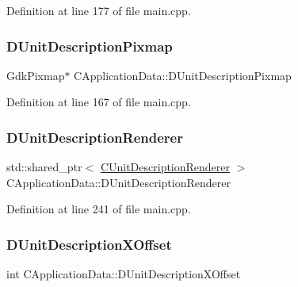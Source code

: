Definition at line 177 of file main.\+cpp.

\hypertarget{classCApplicationData_a52e5c1a2ac452c82580ba3f4978c3501}{}\label{classCApplicationData_a52e5c1a2ac452c82580ba3f4978c3501} 
\subsubsection{\texorpdfstring{D\+Unit\+Description\+Pixmap}{DUnitDescriptionPixmap}}
{\footnotesize\ttfamily Gdk\+Pixmap$\ast$ C\+Application\+Data\+::\+D\+Unit\+Description\+Pixmap\hspace{0.3cm}{\ttfamily [protected]}}



Definition at line 167 of file main.\+cpp.

\hypertarget{classCApplicationData_a194301f34566fc497b032bdfcad55287}{}\label{classCApplicationData_a194301f34566fc497b032bdfcad55287} 
\subsubsection{\texorpdfstring{D\+Unit\+Description\+Renderer}{DUnitDescriptionRenderer}}
{\footnotesize\ttfamily std\+::shared\+\_\+ptr$<$ \hyperlink{classCUnitDescriptionRenderer}{C\+Unit\+Description\+Renderer} $>$ C\+Application\+Data\+::\+D\+Unit\+Description\+Renderer\hspace{0.3cm}{\ttfamily [protected]}}



Definition at line 241 of file main.\+cpp.

\hypertarget{classCApplicationData_a5653b5d0eff32ccd540ad60f5c331c24}{}\label{classCApplicationData_a5653b5d0eff32ccd540ad60f5c331c24} 
\subsubsection{\texorpdfstring{D\+Unit\+Description\+X\+Offset}{DUnitDescriptionXOffset}}
{\footnotesize\ttfamily int C\+Application\+Data\+::\+D\+Unit\+Description\+X\+Offset\hspace{0.3cm}{\ttfamily [protected]}}



